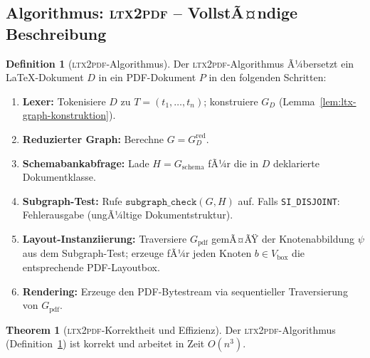 ﻿\documentclass[a4paper,12pt]{article}
\theoremstyle{definition}
\newtheorem{definition}{Definition}
\newtheorem{theorem}{Theorem}
\begin{document}
\subsection{Algorithmus: \textsc{ltx2pdf} -- VollstÃ¤ndige Beschreibung}
\label{sec:ltx-algorithmus}

\begin{definition}[\textsc{ltx2pdf}-Algorithmus]
	\label{def:ltx2pdf}
	Der \textsc{ltx2pdf}-Algorithmus Ã¼bersetzt ein \LaTeX-Dokument $D$
	in ein PDF-Dokument $P$ in den folgenden Schritten:
	\begin{enumerate}
		\item \textbf{Lexer:} Tokenisiere $D$ zu $T = (t_1, \ldots, t_n)$;
		konstruiere $G_D$ (Lemma~\ref{lem:ltx-graph-konstruktion}).
		\item \textbf{Reduzierter Graph:} Berechne $G = G_D^{\mathrm{red}}$.
		\item \textbf{Schemabankabfrage:} Lade $H = G_{\mathrm{schema}}$
		fÃ¼r die in $D$ deklarierte Dokumentklasse.
		\item \textbf{Subgraph-Test:} Rufe $\texttt{subgraph\_check}(G, H)$ auf.
		Falls \texttt{SI\_DISJOINT}: Fehlerausgabe (ungÃ¼ltige Dokumentstruktur).
		\item \textbf{Layout-Instanziierung:} Traversiere $G_{\mathrm{pdf}}$
		gemÃ¤ÃŸ der Knotenabbildung $\psi$ aus dem Subgraph-Test;
		erzeuge fÃ¼r jeden Knoten $b \in V_{\mathrm{box}}$ die
		entsprechende PDF-Layoutbox.
		\item \textbf{Rendering:} Erzeuge den PDF-Bytestream via
		sequentieller Traversierung von $G_{\mathrm{pdf}}$.
	\end{enumerate}
\end{definition}

\begin{theorem}[\textsc{ltx2pdf}-Korrektheit und Effizienz]
	\label{thm:ltx2pdf}
	Der \textsc{ltx2pdf}-Algorithmus (Definition~\ref{def:ltx2pdf}) ist
	korrekt und arbeitet in Zeit $O(n^3)$.
\end{theorem}
\end{document}
